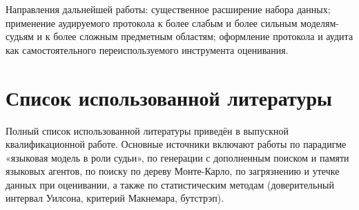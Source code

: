 \documentclass[14pt,a4paper]{extreport}
\begin{document}
Направления дальнейшей работы: существенное расширение набора данных; применение аудируемого протокола к более слабым и более сильным моделям-судьям и к более сложным предметным областям; оформление протокола и аудита как самостоятельного переиспользуемого инструмента оценивания.

\chapter*{Список использованной литературы}

Полный список использованной литературы приведён в выпускной квалификационной работе. Основные источники включают работы по парадигме «языковая модель в роли судьи», по генерации с дополненным поиском и памяти языковых агентов, по поиску по дереву Монте-Карло, по загрязнению и утечке данных при оценивании, а также по статистическим методам (доверительный интервал Уилсона, критерий Макнемара, бутстрэп).
\end{document}
